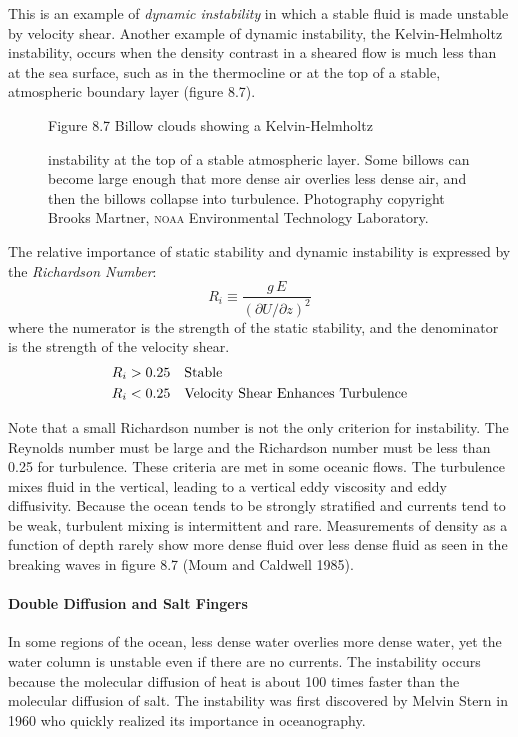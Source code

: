 This is an example of \textit{dynamic
  instability} in which a stable fluid is made unstable by
velocity shear.  Another example of dynamic instability, the
Kelvin-Helmholtz instability, occurs when the density contrast in a
sheared flow is much less than at the sea surface, such as in the
thermocline or at the top of a stable, atmospheric
boundary layer (figure 8.7).
\begin{figure}[t!]
\footnotesize
Figure 8.7 Billow clouds showing a Kelvin-Helmholtz
\rule{0mm}{4ex}instability at the top of a stable atmospheric
layer. Some billows can become large enough that more dense air
overlies less dense air, and then the billows collapse into
turbulence. Photography copyright Brooks
Martner, \textsc{noaa} Environmental Technology Laboratory.
\label{fig:helmholtz}
\vspace{-3ex}
\end{figure}

The relative importance of static stability and dynamic instability is
expressed by the \textit{Richardson Number}:
\begin{equation}
\boxed{R_i\equiv\frac{g\,E}{(\partial{U}/\partial{z})^2} }
\end{equation}
where the numerator is the strength of the static stability, and the
denominator is the strength of the velocity shear.
\begin{align}
R_i &>0.25 \quad \text{Stable} \notag \\
R_i &<0.25 \quad \text{Velocity Shear Enhances Turbulence} \notag
\end{align}

Note that a small Richardson number is not the only criterion for
instability.  The Reynolds number must be large and the Richardson
number must be less than 0.25 for turbulence. These criteria are met
in some oceanic flows. The turbulence mixes fluid in the vertical,
leading to a vertical eddy viscosity and eddy diffusivity. Because the
ocean tends to be strongly stratified and currents tend to be weak,
turbulent mixing is intermittent and rare. Measurements of density as
a function of depth rarely show more dense fluid over less dense fluid
as seen in the breaking waves in figure 8.7 (Moum and Caldwell 1985).

\paragraph{Double Diffusion and Salt Fingers}
In some regions of the ocean,
less dense water overlies more dense water, yet the water column is
unstable even if there are no currents. The instability occurs because
the molecular diffusion of heat is about 100 times faster than the
molecular diffusion of salt. The instability was first discovered by
Melvin Stern in 1960 who quickly realized its importance in
oceanography.

